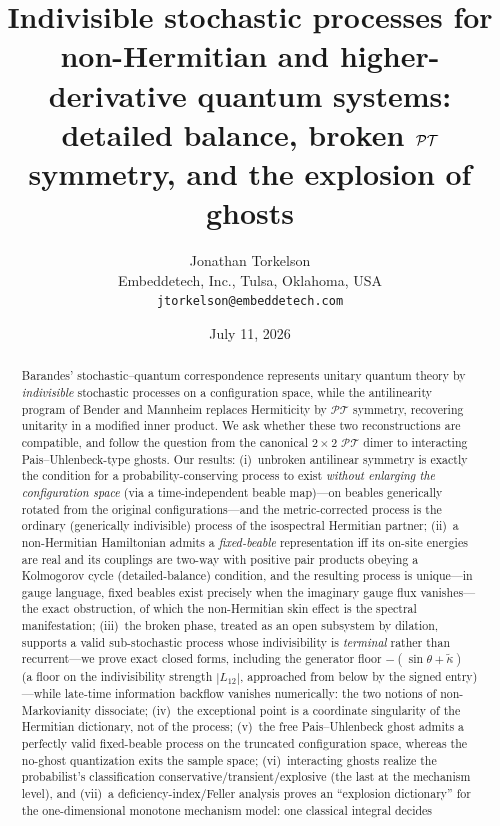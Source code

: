 \documentclass[11pt]{article}
\title{Indivisible stochastic processes for non-Hermitian and
higher-derivative quantum systems:\\
detailed balance, broken $\PT$ symmetry, and the explosion of ghosts}
\author{Jonathan Torkelson\\[2pt]
\small Embeddetech, Inc., Tulsa, Oklahoma, USA\\
\small\texttt{jtorkelson@embeddetech.com}}
\date{July 11, 2026}
\theoremstyle{definition}
\theoremstyle{remark}
\newcommand{\PT}{\mathcal{PT}}
\begin{document}
\maketitle

\begin{abstract}
Barandes' stochastic--quantum correspondence represents unitary quantum
theory by \emph{indivisible} stochastic processes on a configuration space,
while the antilinearity program of Bender and Mannheim replaces Hermiticity
by $\PT$ symmetry, recovering unitarity in a modified inner product. We ask
whether these two reconstructions are compatible, and follow the question
from the canonical $2\times 2$ $\PT$ dimer to interacting
Pais--Uhlenbeck-type ghosts. Our results: (i)~unbroken antilinear symmetry
is exactly the condition for a probability-conserving process
to exist \emph{without enlarging the configuration space} (via a
time-independent beable map)---on
beables generically rotated from the original
configurations---and the metric-corrected process is the ordinary
(generically indivisible) process of the
isospectral Hermitian partner; (ii)~a non-Hermitian Hamiltonian admits a
\emph{fixed-beable} representation iff its on-site energies are real and
its couplings are two-way with positive pair products obeying a
Kolmogorov cycle (detailed-balance) condition, and the resulting process is unique---in gauge
language, fixed beables exist precisely when the imaginary gauge flux
vanishes---the exact obstruction, of which the non-Hermitian skin effect
is the spectral manifestation;
(iii)~the broken phase, treated as an open subsystem by dilation, supports a
valid sub-stochastic process whose indivisibility is \emph{terminal} rather
than recurrent---we prove exact closed forms, including the generator floor
$-(\sin\theta+\tilde\kappa)$ (a floor on the indivisibility strength
$|L_{12}|$, approached from below by the signed entry)---while
late-time information backflow vanishes numerically: the two
notions of non-Markovianity dissociate; (iv)~the exceptional point is a
coordinate singularity of the Hermitian dictionary, not of the process;
(v)~the free Pais--Uhlenbeck ghost admits a perfectly valid fixed-beable
process on the truncated configuration space, whereas the no-ghost
quantization exits the sample space;
(vi)~interacting ghosts realize the probabilist's classification
conservative/transient/explosive (the last at the mechanism level), and (vii)~a deficiency-index/Feller
analysis proves an ``explosion dictionary'' for the one-dimensional
monotone mechanism model: one classical integral decides

\end{abstract}
\end{document}
